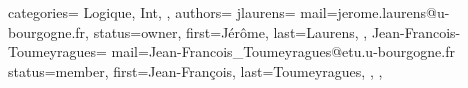 {
  categories={
    Logique,
    Int,
  },
  authors={
    jlaurens={
      mail=jerome.laurens@u-bourgogne.fr,
      status=owner,
      first=Jérôme,
      last=Laurens,
    },
    Jean-Francois-Toumeyragues={
      mail=Jean-Francois_Toumeyragues@etu.u-bourgogne.fr
      status=member,
      first=Jean-François,
      last=Toumeyragues,
    },
  },
}
